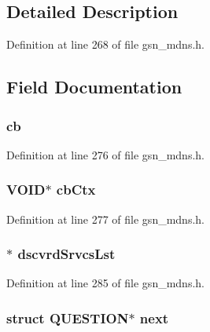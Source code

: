 \subsection{Detailed Description}


Definition at line 268 of file gsn\_\-mdns.h.



\subsection{Field Documentation}
\hypertarget{a00455_a01d247a395cb705f6e9037d660aaa566}{
\subsubsection[{cb}]{ {\bf cb}}}
\label{a00455_a01d247a395cb705f6e9037d660aaa566}


Definition at line 276 of file gsn\_\-mdns.h.

\hypertarget{a00455_abc1717c5357c7dda5c2abef096a06f1f}{
\subsubsection[{cbCtx}]{\setlength{\rightskip}{0pt plus 5cm}VOID$\ast$ {\bf cbCtx}}}
\label{a00455_abc1717c5357c7dda5c2abef096a06f1f}


Definition at line 277 of file gsn\_\-mdns.h.

\hypertarget{a00455_ae26a846dd02159dab9bb42ccc2532439}{
\subsubsection[{dscvrdSrvcsLst}]{$\ast$ {\bf dscvrdSrvcsLst}}}
\label{a00455_ae26a846dd02159dab9bb42ccc2532439}


Definition at line 285 of file gsn\_\-mdns.h.

\hypertarget{a00455_a383361ee362e14b42439287b8c777e91}{
\subsubsection[{next}]{\setlength{\rightskip}{0pt plus 5cm}struct {\bf QUESTION}$\ast$ {\bf next}}}
\label{a00455_a383361ee362e14b42439287b8c777e91}


